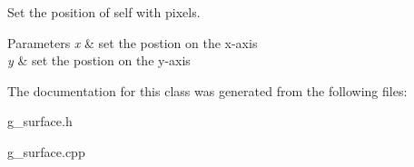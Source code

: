 Set the position of self with pixels. 


\begin{DoxyParams}{Parameters}
{\em x} & set the postion on the x-\/axis \\
\hline
{\em y} & set the postion on the y-\/axis \\
\hline
\end{DoxyParams}


The documentation for this class was generated from the following files\+:\begin{DoxyCompactItemize}
\item 
g\+\_\+surface.\+h\item 
g\+\_\+surface.\+cpp\end{DoxyCompactItemize}
